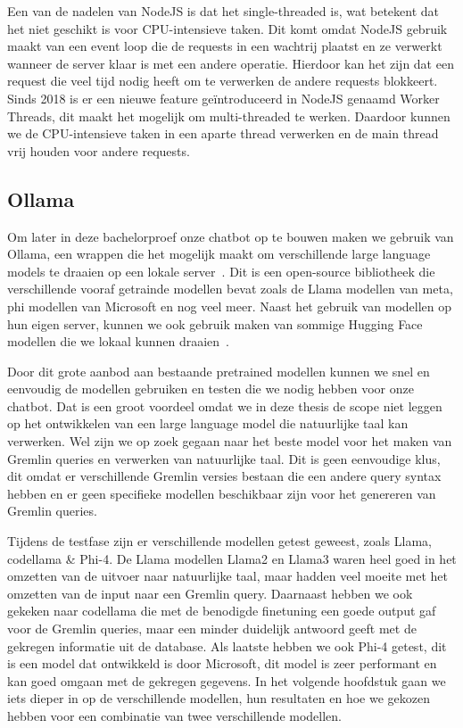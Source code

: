 Een van de nadelen van NodeJS is dat het single-threaded is, wat betekent dat het niet geschikt is voor CPU-intensieve taken.
Dit komt omdat NodeJS gebruik maakt van een event loop die de requests in een wachtrij plaatst en ze verwerkt wanneer de server klaar is met een andere operatie.
Hierdoor kan het zijn dat een request die veel tijd nodig heeft om te verwerken de andere requests blokkeert.
Sinds 2018 is er een nieuwe feature geïntroduceerd in NodeJS genaamd Worker Threads, dit maakt het mogelijk om multi-threaded te werken.
Daardoor kunnen we de CPU-intensieve taken in een aparte thread verwerken en de main thread vrij houden voor andere requests.

\subsection{Ollama}
Om later in deze bachelorproef onze chatbot op te bouwen maken we gebruik van Ollama, een wrappen die het mogelijk maakt om verschillende large language models te draaien op een lokale server~\autocite{Manandhar2025}. 
Dit is een open-source bibliotheek die verschillende vooraf getrainde modellen bevat zoals de Llama modellen van meta, phi modellen van Microsoft en nog veel meer.
Naast het gebruik van modellen op hun eigen server, kunnen we ook gebruik maken van sommige Hugging Face modellen die we lokaal kunnen draaien~\autocite{HuggingFace2024}.

Door dit grote aanbod aan bestaande pretrained modellen kunnen we snel en eenvoudig de modellen gebruiken en testen die we nodig hebben voor onze chatbot.
Dat is een groot voordeel omdat we in deze thesis de scope niet leggen op het ontwikkelen van een large language model die natuurlijke taal kan verwerken.
Wel zijn we op zoek gegaan naar het beste model voor het maken van Gremlin queries en verwerken van natuurlijke taal. 
Dit is geen eenvoudige klus, dit omdat er verschillende Gremlin versies bestaan die een andere query syntax hebben en er geen specifieke modellen beschikbaar zijn voor het genereren van Gremlin queries.

Tijdens de testfase zijn er verschillende modellen getest geweest, zoals Llama, codellama \& Phi-4.
De Llama modellen Llama2 en Llama3 waren heel goed in het omzetten van de uitvoer naar natuurlijke taal, maar hadden veel moeite met het omzetten van de input naar een Gremlin query.
Daarnaast hebben we ook gekeken naar codellama die met de benodigde finetuning een goede output gaf voor de Gremlin queries, maar een minder duidelijk antwoord geeft met de gekregen informatie uit de database.
Als laatste hebben we ook Phi-4 getest, dit is een model dat ontwikkeld is door Microsoft, dit model is zeer performant en kan goed omgaan met de gekregen gegevens.
In het volgende hoofdstuk gaan we iets dieper in op de verschillende modellen, hun resultaten en hoe we gekozen hebben voor een combinatie van twee verschillende modellen.

